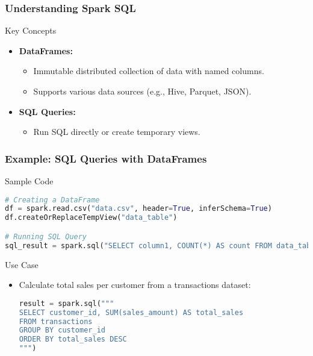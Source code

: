 \documentclass[aspectratio=169]{beamer}
\begin{document}
\begin{frame}[fragile]
    \frametitle{Understanding Spark SQL}
    \begin{block}{Key Concepts}
        \begin{itemize}
            \item \textbf{DataFrames:}
                \begin{itemize}
                    \item Immutable distributed collection of data with named columns.
                    \item Supports various data sources (e.g., Hive, Parquet, JSON).
                \end{itemize}
            \item \textbf{SQL Queries:}
                \begin{itemize}
                    \item Run SQL directly or create temporary views.
                \end{itemize}
        \end{itemize}
    \end{block}
\end{frame}

\begin{frame}[fragile]
    \frametitle{Example: SQL Queries with DataFrames}
    \begin{block}{Sample Code}
        \begin{lstlisting}[language=Python]
# Creating a DataFrame
df = spark.read.csv("data.csv", header=True, inferSchema=True)
df.createOrReplaceTempView("data_table")

# Running SQL Query
sql_result = spark.sql("SELECT column1, COUNT(*) AS count FROM data_table GROUP BY column1")
        \end{lstlisting}
    \end{block}

    \begin{block}{Use Case}
        \begin{itemize}
            \item Calculate total sales per customer from a transactions dataset:
            \begin{lstlisting}[language=Python]
result = spark.sql("""
SELECT customer_id, SUM(sales_amount) AS total_sales
FROM transactions
GROUP BY customer_id
ORDER BY total_sales DESC
""")
            \end{lstlisting}
        \end{itemize}
    \end{block}
\end{frame}
\end{document}
